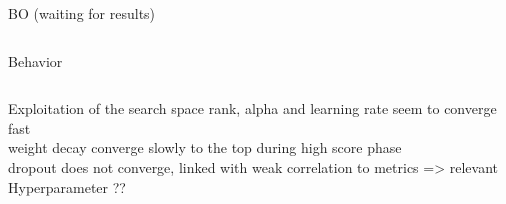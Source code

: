 \begin{frame}[allowframebreaks]{BO (waiting for results)}
\begin{columns}
\begin{column}{0.4\textwidth}
\begin{block}{Behavior}
            \end{block}
             
        \end{column}
    \end{columns}    

    \framebreak

    \begin{columns}
    
        \begin{column}{0.65\textwidth}
            \begin{block}{Exploitation of the search space}
                rank, alpha and learning rate seem to converge fast\\
                weight decay converge slowly to the top during high score phase\\
                
                dropout does not converge, linked with weak correlation to metrics => relevant Hyperparameter ?? 
            \end{block}
        \end{column}


\end{columns}
\end{frame}

